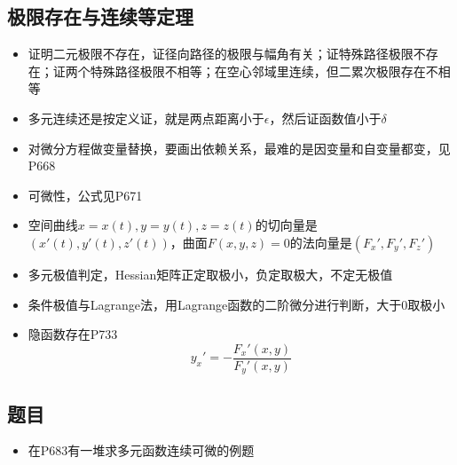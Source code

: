 \documentclass[UTF8]{ctexart}
\begin{document}
\subsection{极限存在与连续等定理}
\begin{itemize}
\item 证明二元极限不存在，证径向路径的极限与幅角有关；证特殊路径极限不存在；证两个特殊路径极限不相等；在空心邻域里连续，但二累次极限存在不相等

\item 多元连续还是按定义证，就是两点距离小于$\epsilon$，然后证函数值小于$\delta$

\item 对微分方程做变量替换，要画出依赖关系，最难的是因变量和自变量都变，见P668

\item 可微性，公式见P671

\item 空间曲线$x=x(t),y=y(t),z=z(t)$的切向量是$(x'(t),y'(t),z'(t))$，曲面$F(x,y,z)=0$的法向量是$(F_x',F_y',F_z')$

\item 多元极值判定，Hessian矩阵正定取极小，负定取极大，不定无极值

\item 条件极值与Lagrange法，用Lagrange函数的二阶微分进行判断，大于0取极小

\item 隐函数存在P733
\[
y_x'=-\frac{F_x'(x,y)}{F_y'(x,y)}
\]
\end{itemize}

\subsection{题目}
\begin{itemize}
\item 在P683有一堆求多元函数连续可微的例题
\end{itemize}
\end{document}
